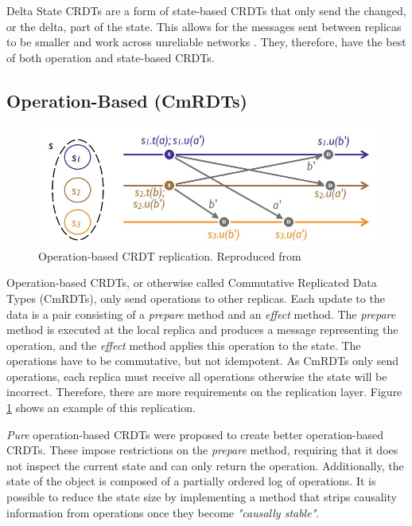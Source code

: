 \documentclass[12pt]{report}
\begin{document}
Delta State CRDTs are a form of state-based CRDTs that only send the changed, or the delta, part of the state. This allows for the messages sent between replicas to be smaller and work across unreliable networks \cite{Almeida_2018}. They, therefore, have the best of both operation and state-based CRDTs.


\subsection{Operation-Based (CmRDTs)}

\begin{figure}
    \centering
    \includegraphics[width=8 cm]{images/operation.jpg}
    \caption{Operation-based CRDT replication. Reproduced from \cite{10.1007/978-3-642-24550-3_29}}
    \label{fig:operation}
\end{figure}

Operation-based CRDTs, or otherwise called Commutative Replicated Data Types (CmRDTs), only send operations to other replicas. Each update to the data is a pair consisting of a \textit{prepare} method and an \textit{effect} method. The \textit{prepare} method is executed at the local replica and produces a message representing the operation, and the \textit{effect} method applies this operation to the state\cite{10.1007/978-3-642-24550-3_29}. The operations have to be commutative, but not idempotent. As CmRDTs only send operations, each replica must receive all operations otherwise the state will be incorrect. Therefore, there are more requirements on the replication layer. Figure \ref{fig:operation} shows an example of this replication. \par

\textit{Pure} operation-based CRDTs were proposed to create better operation-based CRDTs\cite{10.1007/978-3-662-43352-2_11}. These impose restrictions on the \textit{prepare} method, requiring that it does not inspect the current state and can only return the operation. Additionally, the state of the object is composed of a partially ordered log of operations. It is possible to reduce the state size by implementing a method that strips causality information from operations once they become \textit{"causally stable"}\cite{10.1007/978-3-662-43352-2_11}.
\end{document}
